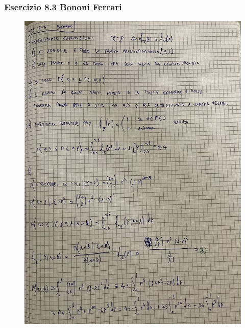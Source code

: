 \documentclass{article}
\begin{document}
\subsubsection{\underline{Esercizio 8.3 Bononi Ferrari}}
\begin{figure}[H]
\centering
\includegraphics[scale=0.10]{ese/41.jpeg}
\end{figure}
\end{document}
